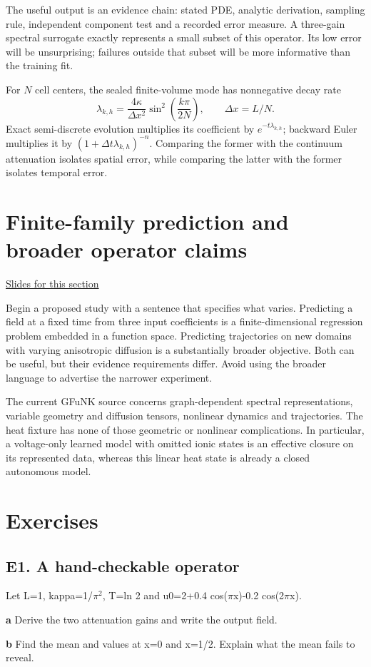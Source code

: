\documentclass[11pt,letterpaper]{article}
\theoremstyle{definition}\newtheorem{definition}{Definition}\newtheorem{example}{Example}
\numberwithin{equation}{section}
\begin{document}
The useful output is an evidence chain: stated PDE, analytic derivation, sampling rule, independent component test and a recorded error measure. A three-gain spectral surrogate exactly represents a small subset of this operator. Its low error will be unsurprising; failures outside that subset will be more informative than the training fit.

For $N$ cell centers, the sealed finite-volume mode has nonnegative decay rate
\[
 \lambda_{k,h}=\frac{4\kappa}{\Delta x^2}\sin^2\left(\frac{k\pi}{2N}\right),
 \qquad\Delta x=L/N.
\]
Exact semi-discrete evolution multiplies its coefficient by $e^{-t\lambda_{k,h}}$; backward Euler multiplies it by $(1+\Delta t\lambda_{k,h})^{-n}$. Comparing the former with the continuum attenuation isolates spatial error, while comparing the latter with the former isolates temporal error.
\section{Finite-family prediction and broader operator claims}
\hypertarget{note-finite-family-prediction-and-broader-operator-claims}{}\label{note:finite-family-prediction-and-broader-operator-claims}
{\small \href{slides.html\#frame=grid-transfer-and-parameter-transfer\&step=1}{Slides for this section}}\par
Begin a proposed study with a sentence that specifies what varies. Predicting a field at a fixed time from three input coefficients is a finite-dimensional regression problem embedded in a function space. Predicting trajectories on new domains with varying anisotropic diffusion is a substantially broader objective. Both can be useful, but their evidence requirements differ. Avoid using the broader language to advertise the narrower experiment.

The current GFuNK source concerns graph-dependent spectral representations, variable geometry and diffusion tensors, nonlinear dynamics and trajectories. The heat fixture has none of those geometric or nonlinear complications. In particular, a voltage-only learned model with omitted ionic states is an effective closure on its represented data, whereas this linear heat state is already a closed autonomous model.
\bigskip
\section*{Exercises}
\par\noindent\begin{minipage}{\linewidth}
\subsection*{E1. A hand-checkable operator}
Let L=\allowbreak{}1, kappa=\allowbreak{}1/$\pi$$^2$, T=\allowbreak{}ln 2 and u0=\allowbreak{}2+\allowbreak{}0.4 cos($\pi$x)-0.2 cos(2$\pi$x).

\textbf{a} Derive the two attenuation gains and write the output field.

\end{minipage}\par\medskip
\textbf{b} Find the mean and values at x=\allowbreak{}0 and x=\allowbreak{}1/2. Explain what the mean fails to reveal.
\end{document}
